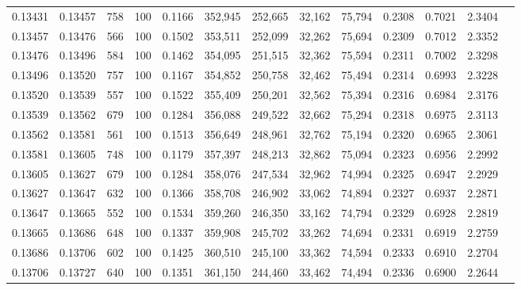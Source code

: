 \begin{tabular}{rrrrrrrrrrrrr}
0.13431 & 0.13457 &   758 & 100 &                                     0.1166 & 352,945 & 252,665 &  32,162 &  75,794 & 0.2308 & 0.7021 & 2.3404 \\
0.13457 & 0.13476 &   566 & 100 &                                     0.1502 & 353,511 & 252,099 &  32,262 &  75,694 & 0.2309 & 0.7012 & 2.3352 \\
0.13476 & 0.13496 &   584 & 100 &                                     0.1462 & 354,095 & 251,515 &  32,362 &  75,594 & 0.2311 & 0.7002 & 2.3298 \\
0.13496 & 0.13520 &   757 & 100 &                                     0.1167 & 354,852 & 250,758 &  32,462 &  75,494 & 0.2314 & 0.6993 & 2.3228 \\
0.13520 & 0.13539 &   557 & 100 &                                     0.1522 & 355,409 & 250,201 &  32,562 &  75,394 & 0.2316 & 0.6984 & 2.3176 \\
0.13539 & 0.13562 &   679 & 100 &                                     0.1284 & 356,088 & 249,522 &  32,662 &  75,294 & 0.2318 & 0.6975 & 2.3113 \\
0.13562 & 0.13581 &   561 & 100 &                                     0.1513 & 356,649 & 248,961 &  32,762 &  75,194 & 0.2320 & 0.6965 & 2.3061 \\
0.13581 & 0.13605 &   748 & 100 &                                     0.1179 & 357,397 & 248,213 &  32,862 &  75,094 & 0.2323 & 0.6956 & 2.2992 \\
0.13605 & 0.13627 &   679 & 100 &                                     0.1284 & 358,076 & 247,534 &  32,962 &  74,994 & 0.2325 & 0.6947 & 2.2929 \\
0.13627 & 0.13647 &   632 & 100 &                                     0.1366 & 358,708 & 246,902 &  33,062 &  74,894 & 0.2327 & 0.6937 & 2.2871 \\
0.13647 & 0.13665 &   552 & 100 &                                     0.1534 & 359,260 & 246,350 &  33,162 &  74,794 & 0.2329 & 0.6928 & 2.2819 \\
0.13665 & 0.13686 &   648 & 100 &                                     0.1337 & 359,908 & 245,702 &  33,262 &  74,694 & 0.2331 & 0.6919 & 2.2759 \\
0.13686 & 0.13706 &   602 & 100 &                                     0.1425 & 360,510 & 245,100 &  33,362 &  74,594 & 0.2333 & 0.6910 & 2.2704 \\
0.13706 & 0.13727 &   640 & 100 &                                     0.1351 & 361,150 & 244,460 &  33,462 &  74,494 & 0.2336 & 0.6900 & 2.2644 \\

\end{tabular}
